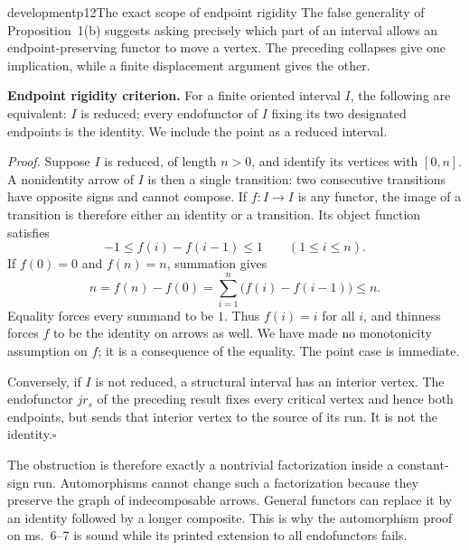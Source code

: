 \begin{dcomment}{development}{p12}{The exact scope of endpoint rigidity}
The false generality of Proposition~1(b) suggests asking precisely which part of an interval allows an endpoint-preserving functor to move a vertex. The preceding collapses give one implication, while a finite displacement argument gives the other.

\textbf{Endpoint rigidity criterion.}\ours{}
For a finite oriented interval $I$, the following are equivalent: $I$ is reduced; every endofunctor of $I$ fixing its two designated endpoints is the identity. We include the point as a reduced interval.

\emph{Proof.} Suppose $I$ is reduced, of length $n>0$, and identify its vertices with $[0,n]$. A nonidentity arrow of $I$ is then a single transition: two consecutive transitions have opposite signs and cannot compose. If $f:I\to I$ is any functor, the image of a transition is therefore either an identity or a transition. Its object function satisfies
\[
 -1\leq f(i)-f(i-1)\leq1\qquad(1\leq i\leq n).
\]
If $f(0)=0$ and $f(n)=n$, summation gives
\[
 n=f(n)-f(0)=\sum_{i=1}^n\bigl(f(i)-f(i-1)\bigr)\leq n.
\]
Equality forces every summand to be $1$. Thus $f(i)=i$ for all $i$, and thinness forces $f$ to be the identity on arrows as well. We have made no monotonicity assumption on $f$; it is a consequence of the equality. The point case is immediate.

Conversely, if $I$ is not reduced, a structural interval has an interior vertex. The endofunctor $j r_s$ of the preceding result fixes every critical vertex and hence both endpoints, but sends that interior vertex to the source of its run. It is not the identity.\hfill$\square$

The obstruction is therefore exactly a nontrivial factorization inside a constant-sign run. Automorphisms cannot change such a factorization because they preserve the graph of indecomposable arrows. General functors can replace it by an identity followed by a longer composite. This is why the automorphism proof on ms.~6--7 is sound while its printed extension to all endofunctors fails.
\end{dcomment}

